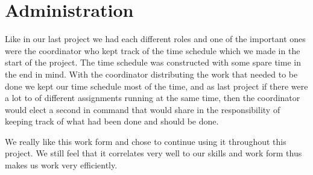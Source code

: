 \section{Administration}

Like in our last project we had each different roles and one of the important ones were the coordinator who kept track of the time schedule which we made in the start of the project. The time schedule was constructed with some spare time in the end in mind. With the coordinator distributing the work that needed to be done we kept our time schedule most of the time, and as last project if there were a lot to of different assignments running at the same time, then the coordinator would elect a second in command that would share in the responsibility of keeping track of what had been done and should be done.

We really like this work form and chose to continue using it throughout this project. We still feel that it correlates very well to our skills and work form thus makes us work very efficiently.